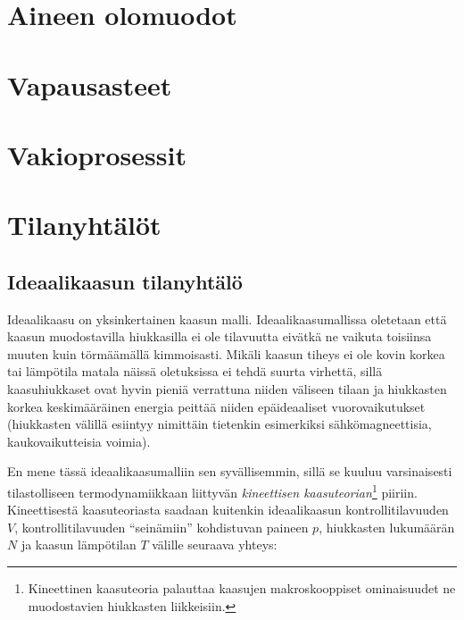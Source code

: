 \documentclass[12pt,a4paper,finnish]{book}
\begin{document}
\section{Aineen olomuodot} %


\section{Vapausasteet} %

\section{Vakioprosessit}%

\section{Tilanyhtälöt}%


\subsection{Ideaalikaasun tilanyhtälö}

Ideaalikaasu on yksinkertainen kaasun malli. Ideaalikaasumallissa oletetaan että kaasun muodostavilla 
hiukkasilla ei ole tilavuutta eivätkä ne vaikuta toisiinsa muuten kuin törmäämällä kimmoisasti. 
Mikäli kaasun tiheys ei ole kovin korkea tai lämpötila matala näissä oletuksissa 
ei tehdä suurta virhettä, sillä kaasuhiukkaset ovat hyvin pieniä verrattuna niiden väliseen tilaan 
ja hiukkasten korkea keskimääräinen energia peittää niiden epäideaaliset vuorovaikutukset 
(hiukkasten välillä esiintyy nimittäin tietenkin esimerkiksi sähkömagneettisia, kaukovaikutteisia 
voimia).

En mene tässä ideaalikaasumalliin sen syvällisemmin, sillä se kuuluu varsinaisesti tilastolliseen 
termodynamiikkaan liittyvän \textit{kineettisen kaasuteorian}\footnote{Kineettinen kaasuteoria 
palauttaa kaasujen makroskooppiset ominaisuudet ne muodostavien hiukkasten liikkeisiin.} piiriin. 
Kineettisestä kaasuteoriasta saadaan kuitenkin ideaalikaasun kontrollitilavuuden $V$, kontrollitilavuuden 
``seinämiin'' kohdistuvan paineen $p$, hiukkasten lukumäärän $N$ ja kaasun lämpötilan $T$ välille 
seuraava yhteys:
\end{document}
